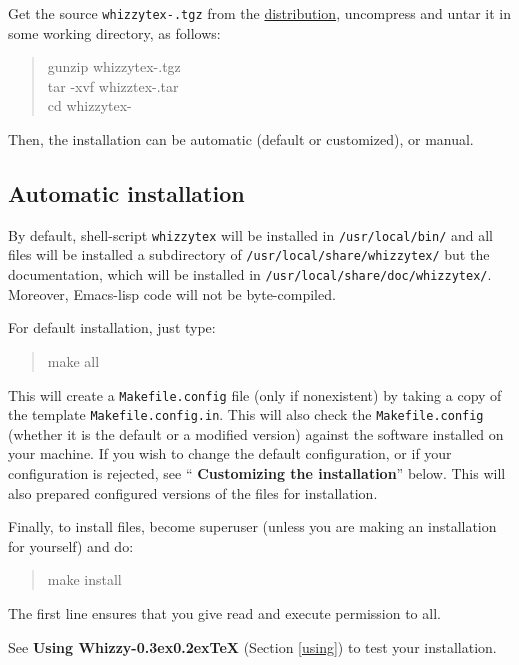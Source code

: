 \documentclass[12pt]{article}
\makeatletter
\let \lst \verb
\def \whizzy {{Whizzy\kern -0.3ex\raise 0.2ex\hbox{\let \@\relax\TeX}}}
\makeatother
\begin{document}
Get the source {\tt whizzytex-\version.tgz} 
from the \href{http://pauillac.inria.fr/whizzytex}{distribution}, 
uncompress and untar it in some working directory, as follows:
\begin{quote}
\begin{tt}
gunzip whizzytex-\version.tgz\\
tar -xvf whizztex-\version.tar\\
cd whizzytex-\version
\end{tt}
\end{quote}
Then, the installation can be automatic (default or customized), or manual.

\subsection {Automatic installation}

\label {install/automatic}

By default, shell-script \lst"whizzytex" will be installed in 
\lst"/usr/local/bin/" and all files will be installed a subdirectory
of \lst"/usr/local/share/whizzytex/" 
but the documentation, which will be installed in
\lst"/usr/local/share/doc/whizzytex/". 
Moreover,  Emacs-lisp code will not be byte-compiled. 

For default installation, just type: 
\begin{quote}
\begin{tt}
make all
\end{tt}
\end{quote}
This will create a \lst"Makefile.config" file (only if nonexistent) by
taking a copy of the template \lst"Makefile.config.in". This will also check
the \lst"Makefile.config" (whether it is the default or a modified version)
against the software installed on your machine.  If you wish to change the
default configuration, or if your configuration is rejected, see ``{\bf
Customizing the installation}'' below. This will also prepared configured
versions of the files for installation.

Finally, to install files, become superuser (unless you are making 
an installation for yourself) and do:
\begin{quote}
\begin{tt}
make install
\end{tt}
\end{quote}
The first line ensures that you give read and execute permission to all.

See {\bf Using {\whizzy}} (Section \ref {using}) to test your
installation.
\end{document}
